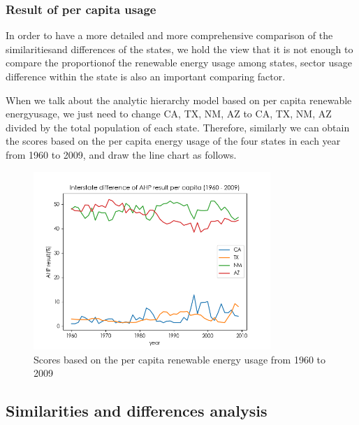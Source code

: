 \documentclass[a4paper,11pt]{article}
\begin{document}
\subsubsection{Result of per capita usage}
\par In order to have a more detailed and more comprehensive comparison of the similaritiesand differences of the states, we hold the view that it is not enough to compare the proportionof the renewable energy usage among states, sector usage difference within the state is also an important comparing factor.
\par When we talk about the analytic hierarchy model based on per capita renewable energyusage, we just need to change CA, TX, NM, AZ to CA, TX, NM, AZ divided by the total population of each state. Therefore, similarly we can obtain the scores based on the per capita energy usage of the four states in each year from 1960 to 2009, and draw the line chart as follows.
\begin{figure}[!hptb] 
    \centering 
    \includegraphics[width=0.8\textwidth]{./Pic/B-level-percapita.png}
    \caption{Scores based on the per capita renewable energy usage from 1960 to 2009}
    \label{fig:B-level-percapita}
\end{figure}



\subsection{Similarities and differences analysis}
\end{document}
